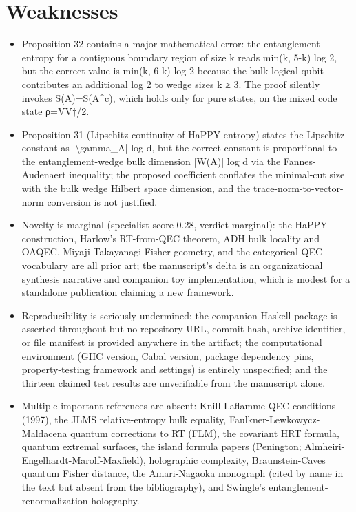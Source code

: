 \documentclass[11pt]{article}
\begin{document}
\section*{Weaknesses}
\begin{itemize}[leftmargin=*]
  \item Proposition 32 contains a major mathematical error: the entanglement entropy for a contiguous boundary region of size k reads min(k, 5-k) log 2, but the correct value is min(k, 6-k) log 2 because the bulk logical qubit contributes an additional log 2 to wedge sizes k ≥ 3. The proof silently invokes S(A)=S(A\^{}c), which holds only for pure states, on the mixed code state ρ=VV†/2.
  \item Proposition 31 (Lipschitz continuity of HaPPY entropy) states the Lipschitz constant as |\textbackslash{}gamma\_A| log d, but the correct constant is proportional to the entanglement-wedge bulk dimension |W(A)| log d via the Fannes-Audenaert inequality; the proposed coefficient conflates the minimal-cut size with the bulk wedge Hilbert space dimension, and the trace-norm-to-vector-norm conversion is not justified.
  \item Novelty is marginal (specialist score 0.28, verdict marginal): the HaPPY construction, Harlow's RT-from-QEC theorem, ADH bulk locality and OAQEC, Miyaji-Takayanagi Fisher geometry, and the categorical QEC vocabulary are all prior art; the manuscript's delta is an organizational synthesis narrative and companion toy implementation, which is modest for a standalone publication claiming a new framework.
  \item Reproducibility is seriously undermined: the companion Haskell package is asserted throughout but no repository URL, commit hash, archive identifier, or file manifest is provided anywhere in the artifact; the computational environment (GHC version, Cabal version, package dependency pins, property-testing framework and settings) is entirely unspecified; and the thirteen claimed test results are unverifiable from the manuscript alone.
  \item Multiple important references are absent: Knill-Laflamme QEC conditions (1997), the JLMS relative-entropy bulk equality, Faulkner-Lewkowycz-Maldacena quantum corrections to RT (FLM), the covariant HRT formula, quantum extremal surfaces, the island formula papers (Penington; Almheiri-Engelhardt-Marolf-Maxfield), holographic complexity, Braunstein-Caves quantum Fisher distance, the Amari-Nagaoka monograph (cited by name in the text but absent from the bibliography), and Swingle's entanglement-renormalization holography.

\end{itemize}
\end{document}

